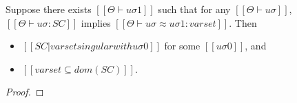 \begin{lemma}
\end{lemma}

\begin{lemma}
    \label{lemma:singularity-completeness}
    Suppose there exists $[[Θ ⊢ uσ1]]$ such that
    for any $[[Θ ⊢ uσ]]$, $[[Θ ⊢ uσ : SC]]$ implies $[[Θ ⊢ uσ ≈ uσ1 : varset]]$.
    Then 
    \begin{itemize}
        \item $[[SC|varset singular with uσ0]]$ for some $[[uσ0]]$, and
        \item $[[varset ⊆ dom(SC)]]$.
    \end{itemize} 
\end{lemma}
\begin{proof}
\end{proof}